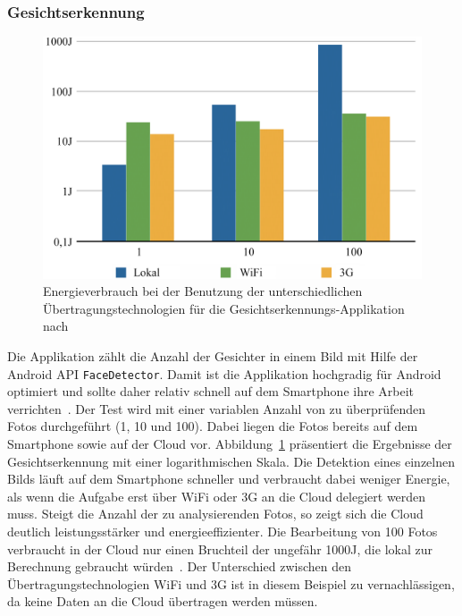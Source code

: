 \documentclass{sigchi}
\begin{document}
\subsubsection{Gesichtserkennung}

\begin{figure}
\centering
  \includegraphics[width=1.0\columnwidth]{images/thinkair}
  \caption{Energieverbrauch bei der Benutzung der unterschiedlichen Über\-tra\-gungs\-tech\-no\-lo\-gien für die Gesichtserkennungs-Applikation nach~\protect\cite{thinkair}}\label{fig:thinkair}
\end{figure}

Die Applikation zählt die Anzahl der Gesichter in einem Bild mit Hilfe der Android API \texttt{FaceDetector}.
Damit ist die Applikation hochgradig für Android optimiert und sollte daher relativ schnell auf dem Smartphone ihre Arbeit verrichten~\cite{thinkair}.
Der Test wird mit einer variablen Anzahl von zu überprüfenden Fotos durchgeführt (1, 10 und 100).
Dabei liegen die Fotos bereits auf dem Smartphone sowie auf der Cloud vor.
Abbildung~\ref{fig:thinkair} präsentiert die Ergebnisse der Gesichtserkennung mit einer logarithmischen Skala.
Die Detektion eines einzelnen Bilds läuft auf dem Smartphone schneller und verbraucht dabei weniger Energie, als wenn die Aufgabe erst über WiFi oder 3G an die Cloud delegiert werden muss.
Steigt die Anzahl der zu analysierenden Fotos, so zeigt sich die Cloud deutlich leistungsstärker und energieeffizienter.
Die Bearbeitung von 100 Fotos verbraucht in der Cloud nur einen Bruchteil der ungefähr 1000J, die lokal zur Berechnung gebraucht würden~\cite{thinkair}.
Der Unterschied zwischen den Übertragungstechnologien WiFi und 3G ist in diesem Beispiel zu vernachlässigen, da keine Daten an die Cloud übertragen werden müssen.
\end{document}
